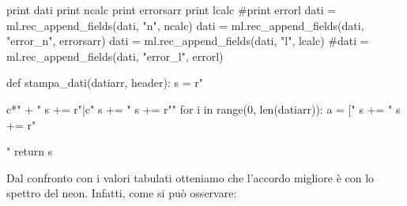 \begin{sagesilent}
print dati
print ncalc
print errorsarr
print lcalc
#print errorl
dati = ml.rec_append_fields(dati, "n", ncalc)
dati = ml.rec_append_fields(dati, "error_n", errorsarr)
dati = ml.rec_append_fields(dati, "l", lcalc)
#dati = ml.rec_append_fields(dati, "error_l", errorl)

def stampa_dati(datiarr, header):
  s = r"\begin{tabular}{c*{" + "%
  s += r"}{|c}}"
  s += "%
  s += r"\midrule"
  for i in range(0, len(datiarr)):
    a = ["%
    s += "%
  s += r"\end{tabular}"
  return s
\end{sagesilent}

\begin{center}
\end{center}


Dal confronto con i valori tabulati otteniamo che l'accordo migliore è con lo spettro del neon. Infatti, come si può osservare:


